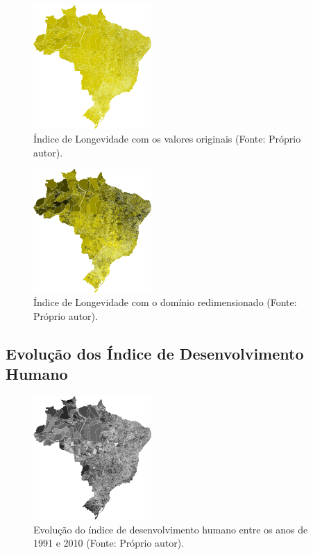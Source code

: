 \documentclass[conference]{IEEEtran}
\begin{document}
\begin{figure}[!ht]
\centering
\includegraphics[width=0.40\textwidth]{longevidade.png}
\caption{Índice de Longevidade com os valores originais (Fonte: Próprio autor).}
\label{img:longevidade-absoluto}
\end{figure}

\begin{figure}[!ht]
\centering
\includegraphics[width=0.40\textwidth]{longevidade-ampliado.png}
\caption{Índice de Longevidade com o domínio redimensionado (Fonte: Próprio autor).}
\label{img:longevidade-ampliado}
\end{figure}


\subsection{Evolução dos Índice de Desenvolvimento Humano}


\begin{figure}[!ht]
\centering
\includegraphics[width=0.40\textwidth]{evolucao.png}
\caption{Evolução do índice de desenvolvimento humano entre os anos de 1991 e 2010 (Fonte: Próprio autor).}
\label{img:evolucao-idh}
\end{figure}
\end{document}
